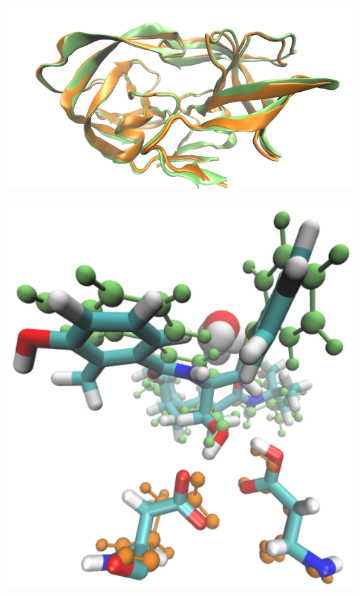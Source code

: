\documentclass[12pt,a4paper]{article}
\begin{document}
	\begin{figure}[h]
	\centering
	\begin{subfigure}[b]{0.64\textwidth}
		\centering
		\includegraphics[width=\textwidth]{images/conformations.pdf}
		\caption{}
		\label{fig:an:conformations}
	\end{subfigure}
	\begin{subfigure}[b]{0.34\textwidth}
		\centering
		\includegraphics[width=\textwidth]{images/1UN-comparison-crop.pdf}
		\caption{}
		\label{fig:an:1UN-comparison}
	\end{subfigure}

\end{figure}
\end{document}
